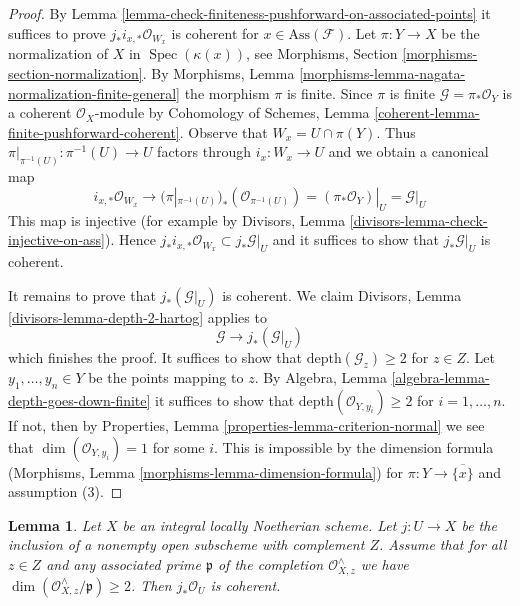 \documentclass{stacks-project}
\theoremstyle{plain}
\newtheorem{lemma}[subsection]{Lemma}
\theoremstyle{definition}
\theoremstyle{remark}
\numberwithin{equation}{subsection}
\def\Spec{\mathop{\mathrm{Spec}}}
\begin{document}
\begin{proof}
By Lemma \ref{lemma-check-finiteness-pushforward-on-associated-points}
it suffices to prove $j_*i_{x, *}\mathcal{O}_{W_x}$ is coherent
for $x \in \text{Ass}(\mathcal{F})$.
Let $\pi : Y \to X$ be the normalization of $X$ in $\Spec(\kappa(x))$, see
Morphisms, Section \ref{morphisms-section-normalization}. By
Morphisms, Lemma \ref{morphisms-lemma-nagata-normalization-finite-general}
the morphism $\pi$ is finite. Since $\pi$ is finite
$\mathcal{G} = \pi_*\mathcal{O}_Y$ is a coherent $\mathcal{O}_X$-module by
Cohomology of Schemes, Lemma \ref{coherent-lemma-finite-pushforward-coherent}.
Observe that $W_x = U \cap \pi(Y)$. Thus
$\pi|_{\pi^{-1}(U)} : \pi^{-1}(U) \to U$ factors through $i_x : W_x \to U$
and we obtain a canonical map
$$
i_{x, *}\mathcal{O}_{W_x}
\longrightarrow
(\pi|_{\pi^{-1}(U)})_*(\mathcal{O}_{\pi^{-1}(U)}) =
(\pi_*\mathcal{O}_Y)|_U = \mathcal{G}|_U
$$
This map is injective (for example by Divisors, Lemma
\ref{divisors-lemma-check-injective-on-ass}). Hence
$j_*i_{x, *}\mathcal{O}_{W_x} \subset j_*\mathcal{G}|_U$
and it suffices to show that $j_*\mathcal{G}|_U$ is coherent.

\medskip\noindent
It remains to prove that $j_*(\mathcal{G}|_U)$ is coherent. We claim
Divisors, Lemma \ref{divisors-lemma-depth-2-hartog}
applies to
$$
\mathcal{G} \longrightarrow j_*(\mathcal{G}|_U)
$$
which finishes the proof. It suffices to show that
$\text{depth}(\mathcal{G}_z) \geq 2$ for $z \in Z$.
Let $y_1, \ldots, y_n \in Y$ be the points mapping to $z$.
By Algebra, Lemma \ref{algebra-lemma-depth-goes-down-finite}
it suffices to show that
$\text{depth}(\mathcal{O}_{Y, y_i}) \geq 2$ for $i = 1, \ldots, n$.
If not, then by Properties, Lemma \ref{properties-lemma-criterion-normal}
we see that $\dim(\mathcal{O}_{Y, y_i}) = 1$ for some $i$.
This is impossible by the dimension formula
(Morphisms, Lemma \ref{morphisms-lemma-dimension-formula})
for $\pi : Y \to \overline{\{x\}}$ and assumption (3).
\end{proof}

\begin{lemma}
\label{lemma-sharp-finiteness-pushforward}
Let $X$ be an integral locally Noetherian scheme. Let $j : U \to X$
be the inclusion of a nonempty open subscheme with complement $Z$. Assume
that for all $z \in Z$ and any associated prime $\mathfrak p$ of
the completion $\mathcal{O}_{X, z}^\wedge$
we have $\dim(\mathcal{O}_{X, z}^\wedge/\mathfrak p) \geq 2$.
Then $j_*\mathcal{O}_U$ is coherent.
\end{lemma}
\end{document}

